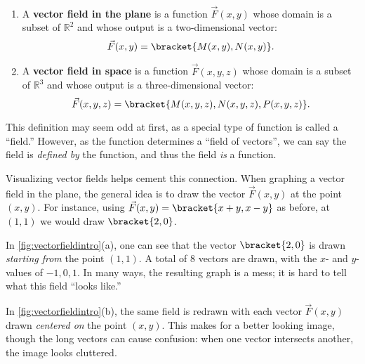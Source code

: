\begin{definition}\label{def:vector_field}
%
\mbox{}\\[-2\baselineskip]\parbox[t]{\linewidth}{\begin{enumerate}
	\item A \textbf{vector field in the plane} is a function $\vec F(x,y)$ whose domain is a subset of $\mathbb{R}^2$ and whose output is a two-dimensional vector:
	\[\vec F(x,y) =\bracket{M(x,y), N(x,y)}.\]
	\item A \textbf{vector field in space} is a function $\vec F(x,y,z)$ whose domain is a subset of $\mathbb{R}^3$ and whose output is a three-dimensional vector:
	\[\vec F(x,y,z) =\bracket{M(x,y,z), N(x,y,z), P(x,y,z)}.\]
\end{enumerate}}
\end{definition}

This definition may seem odd at first, as a special type of function is called a ``field.'' However, as the function determines a ``field of vectors'', we can say the field is \emph{defined by} the function, and thus the field \emph{is} a function.

Visualizing vector fields helps cement this connection. When graphing a vector field in the plane, the general idea is to draw the vector $\vec F(x,y)$ at the point $(x,y)$. For instance, using $\vec F(x,y) =\bracket{x+y,x-y}$ as before, at $(1,1)$ we would draw $\bracket{2,0}$. 

In \autoref{fig:vectorfieldintro}(a), one can see that the vector $\bracket{2,0}$ is drawn \emph{starting from} the point $(1,1)$. A total of 8 vectors are drawn, with the $x$- and $y$-values of $-1,0,1$. In many ways, the resulting graph is a mess; it is hard to tell what this field ``looks like.''

In \autoref{fig:vectorfieldintro}(b), the same field is redrawn with each vector $\vec F(x,y)$ drawn \emph{centered on} the point $(x,y)$. This makes for a better looking image, though the long vectors can cause confusion: when one vector intersects another, the image looks cluttered.

